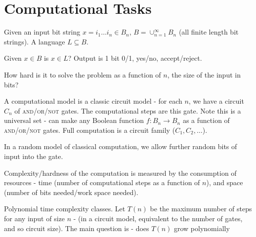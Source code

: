\section{Computational Tasks}
\label{sec:computational-tasks}

Given an input bit string $x = i_{1} \dots i_{n} \in B_{n}$, $B =
\cup_{n=1}^{\infty} B_{n}$ (all finite length bit strings).  A
language $L \subseteq B$.

\begin{defn}
  \label{defn:fundamentals:1}
  Given $x \in B$ is $x \in L$?  Output is 1 bit 0/1, yes/no, accept/reject.
\end{defn}

\begin{question}
  How hard is it to solve the problem as a function of $n$, the size
  of the input in bits?
\end{question}
A computational model is a classic circuit model - for each $n$, we
have a circuit $C_{n}$ of \textsc{and}/\textsc{or}/\textsc{not} gates.
The computational steps are this gate. Note this is a universal set -
can make any Boolean function $f: B_{n} \rightarrow B_{n}$ as a
function of \textsc{and}/\textsc{or}/\textsc{not} gates.  Full
computation is a circuit family ($C_{1}, C_{2}, \dots$).

In a random model of classical computation, we allow further random
bits of input into the gate.

Complexity/hardness of the computation is measured by the consumption
of resources - time (number of computational steps as a function of
$n$), and space (number of bits needed/work space needed).

Polynomial time complexity classes.  Let $T(n)$ be the maximum number
of steps for any input of size $n$ - (in a circuit model, equivalent
to the number of gates, and so circuit size).  The main question is -
does $T(n)$ grow polynomially 



